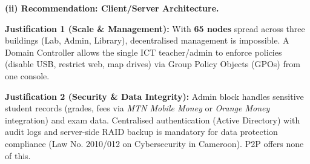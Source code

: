 \documentclass[11pt]{article}
\begin{document}
\begin{exoresolu}
\noindent\textbf{(ii) Recommendation: \textbf{Client/Server Architecture}.}

\noindent\textbf{Justification 1 (Scale \& Management):} With \textbf{65 nodes} spread across three buildings (Lab, Admin, Library), decentralised management is impossible. A Domain Controller allows the single ICT teacher/admin to enforce policies (disable USB, restrict web, map drives) via Group Policy Objects (GPOs) from one console.

\noindent\textbf{Justification 2 (Security \& Data Integrity):} Admin block handles sensitive student records (grades, fees via \textit{MTN Mobile Money} or \textit{Orange Money} integration) and exam data. Centralised authentication (Active Directory) with audit logs and server-side RAID backup is mandatory for data protection compliance (Law No. 2010/012 on Cybersecurity in Cameroon). P2P offers none of this.
\end{exoresolu}
\end{document}
